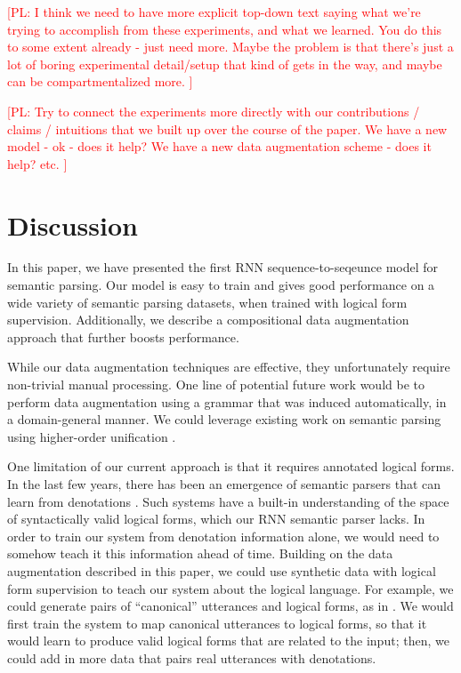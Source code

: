 \documentclass[11pt,letterpaper]{article}
\newcommand\pl[1]{\textcolor{red}{[PL: #1]}}
\begin{document}
\pl{I think we need to have more explicit top-down text saying what we're
  trying to accomplish from these experiments, and what we learned.  You do
  this to some extent already - just need more.
  Maybe the problem is that there's just a lot of boring experimental detail/setup
  that kind of gets in the way, and maybe can be compartmentalized more.
}

\pl{
  Try to connect the experiments more directly with our contributions / claims
  / intuitions that we built up over the course of the paper.
  We have a new model - ok - does it help?
  We have a new data augmentation scheme - does it help?
  etc.
}

\section{Discussion}
In this paper, we have presented the first RNN sequence-to-seqeunce
model for semantic parsing.  Our model is easy to train
and gives good performance on a wide variety of semantic parsing
datasets, when trained with logical form supervision.
Additionally, we describe a compositional data augmentation approach that 
further boosts performance.

While our data augmentation techniques are effective,
they unfortunately require non-trivial manual processing.
One line of potential future work would be to
perform data augmentation using a grammar
that was induced automatically, in a domain-general manner.
We could leverage existing work on semantic parsing
using higher-order unification \cite{kwiatkowski10ccg}.

One limitation of our current approach is that it 
requires annotated logical forms.
In the last few years, there has been an emergence of
semantic parsers that can learn from denotations 
\cite{liang11dcs,berant2013freebase}.
Such systems have a built-in understanding of the space of
syntactically valid logical forms, which our RNN semantic parser lacks.
In order to train our system from denotation information alone,
we would need to somehow teach it this information ahead of time.
Building on the data augmentation described in this paper,
we could use synthetic data with logical form supervision
to teach our system about the logical language.
For example, we could generate
pairs of ``canonical'' utterances and logical forms,
as in \cite{wang2015overnight}.  
We would first train the system to map
canonical utterances to logical forms, so that it would learn to produce
valid logical forms that are related to the input;
then, we could add in more data that pairs real utterances with denotations.
\end{document}
